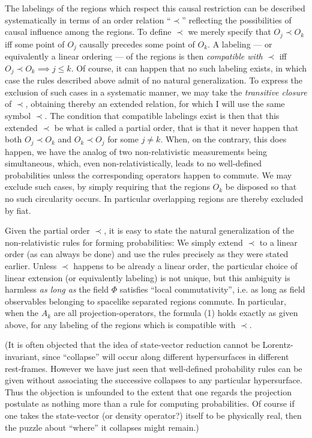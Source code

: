\tx
The labelings of the regions which respect this causal restriction can
be described systematically in terms of an order relation ``$\prec$''
reflecting the possibilities of causal influence among the regions.
To define $\prec$ we merely specify that $O_j\prec O_k$ iff some point
of $O_j$ causally precedes some point of $O_k$.  A labeling --- or
equivalently a linear ordering --- of the regions is then {\it
compatible with} $\prec$ iff $O_j \prec O_k \implies j \leq k$.  Of
course, it can happen that no such labeling exists, in which case the
rules described above admit of no natural generalization.  To express
the exclusion of such cases in a systematic manner, we may take the
{\it transitive closure} of $\prec$, obtaining thereby an extended
relation, for which I will use the same symbol $\prec$.  The condition
that compatible labelings exist is then that this extended $\prec$ be
what is called a partial order, that is that it never happen that both
$O_j \prec O_k$ and $O_k \prec O_j$ for some $j \not= k$.  When, on
the contrary, this does happen, we have the analog of two
non-relativistic measurements being simultaneous, which, even
non-relativistically, leads to no well-defined probabilities unless
the corresponding operators happen to commute.  We may exclude such
cases, by simply requiring that the regions $O_k$ be disposed so that
no such circularity occurs.  In particular overlapping regions are
thereby excluded by fiat.

\tx
Given the partial order $\prec$, it is easy to state the natural
generalization of the non-relativistic rules for forming
probabilities: We simply extend $\prec$ to a linear order (as can
always be done) and use the rules precisely as they were stated
earlier.  Unless $\prec$ happens to be already a linear order, the
particular choice of linear extension (or equivalently labeling) is
not unique, but this ambiguity is harmless {\it as long as} the field
$\Phi$ satisfies ``local commutativity'', i.e.  as long as field
observables belonging to spacelike separated regions commute.  In
particular, when the $A_k$ are all projection-operators, the formula
(1) holds exactly as given above, for any labeling of the regions
which is compatible with $\prec$.


\tx
(It is often objected that the idea of state-vector reduction cannot
be Lorentz-in\-vari\-ant, since ``collapse'' will occur along
different hypersurfaces in different rest-frames.  However we have
just seen that well-defined probability rules can be given without
associating the successive collapses to any particular hypersurface.
Thus the objection is unfounded to the extent that one regards the
projection postulate as nothing more than a rule for computing
probabilities.  Of course if one takes the state-vector (or density
operator?) itself to be physically real, then the puzzle about
``where'' it collapses might remain.)


